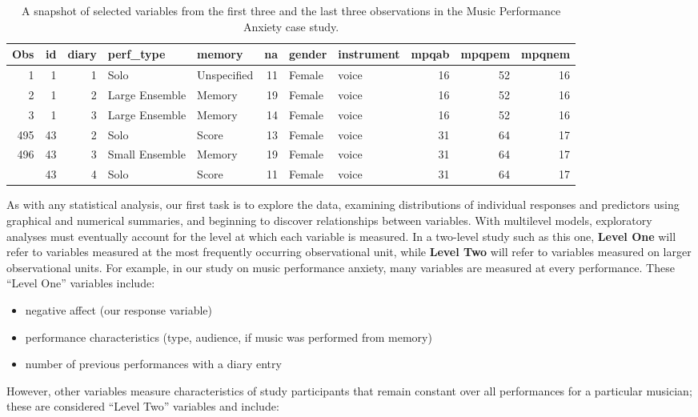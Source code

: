\documentclass[
]{krantz}
\providecommand{\tightlist}{%
  \setlength{\itemsep}{0pt}\setlength{\parskip}{0pt}}
\begin{document}
\begin{table}

\caption{\label{tab:table1chp8}A snapshot of selected variables from the first three and the last three observations in the Music Performance Anxiety case study.}
\centering
\begin{tabular}[t]{rrrllrllrrr}
\toprule
Obs & id & diary & perf\_type & memory & na & gender & instrument & mpqab & mpqpem & mpqnem\\
\midrule
1 & 1 & 1 & Solo & Unspecified & 11 & Female & voice & 16 & 52 & 16\\
2 & 1 & 2 & Large Ensemble & Memory & 19 & Female & voice & 16 & 52 & 16\\
3 & 1 & 3 & Large Ensemble & Memory & 14 & Female & voice & 16 & 52 & 16\\
495 & 43 & 2 & Solo & Score & 13 & Female & voice & 31 & 64 & 17\\
496 & 43 & 3 & Small Ensemble & Memory & 19 & Female & voice & 31 & 64 & 17\\
\addlinespace
497 & 43 & 4 & Solo & Score & 11 & Female & voice & 31 & 64 & 17\\
\bottomrule
\end{tabular}
\end{table}

As with any statistical analysis, our first task is to explore the data, examining distributions of individual responses and predictors using graphical and numerical summaries, and beginning to discover relationships between variables. With multilevel models, exploratory analyses must eventually account for the level at which each variable is measured. In a two-level study such as this one, \textbf{Level One} will refer to variables measured at the most frequently occurring observational unit, while \textbf{Level Two} will refer to variables measured on larger observational units. For example, in our study on music performance anxiety, many variables are measured at every performance. These ``Level One'' variables include:

\begin{itemize}
\tightlist
\item
  negative affect (our response variable)
\item
  performance characteristics (type, audience, if music was performed from memory)
\item
  number of previous performances with a diary entry
\end{itemize}

However, other variables measure characteristics of study participants that remain constant over all performances for a particular musician; these are considered ``Level Two'' variables and include:
\end{document}
